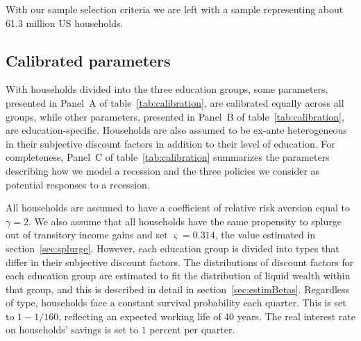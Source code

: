 \documentclass[../HAFiscal]{subfiles}
\begin{document}
With our sample selection criteria we are left with a sample representing about 61.3 million US households.

\subsection{Calibrated parameters} 
\label{sec:calib}

With households divided into the three education groups, some parameters, presented in Panel~A of table~\ref{tab:calibration}, are calibrated equally across all groups, while other parameters, presented in Panel~B of table~\ref{tab:calibration}, are education-specific.  Households are also assumed to be ex-ante heterogeneous in their subjective discount factors in addition to their level of education. For completeness, Panel~C of table~\ref{tab:calibration} summarizes the parameters describing how we model a recession and the three policies we consider as potential responses to a recession. 

All households are assumed to have a coefficient of relative risk aversion equal to $\gamma=2$. We also assume that all households have the same propensity to splurge out of transitory income gains and set $\varsigma=0.314$, the value estimated in section~\ref{sec:splurge}. However, each education group is divided into types that differ in their subjective discount factors. The distributions of discount factors for each education group are estimated to fit the distribution of liquid wealth within that group, and this is described in detail in section~\ref{sec:estimBetas}. Regardless of type, households face a constant survival probability each quarter. This is set to $1-1/160$, reflecting an expected working life of 40 years. The real interest rate on households' savings is set to $1$ percent per quarter. 
\end{document}
